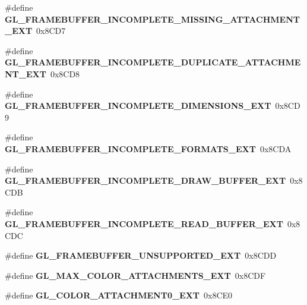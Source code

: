 \begin{DoxyCompactItemize}
\item 
\#define {\bfseries G\+L\+\_\+\+F\+R\+A\+M\+E\+B\+U\+F\+F\+E\+R\+\_\+\+I\+N\+C\+O\+M\+P\+L\+E\+T\+E\+\_\+\+M\+I\+S\+S\+I\+N\+G\+\_\+\+A\+T\+T\+A\+C\+H\+M\+E\+N\+T\+\_\+\+E\+X\+T}~0x8\+C\+D7\label{_s_d_l__opengl_8h_a9da899ca15cb6f3b95a56e015498eb65}

\item 
\#define {\bfseries G\+L\+\_\+\+F\+R\+A\+M\+E\+B\+U\+F\+F\+E\+R\+\_\+\+I\+N\+C\+O\+M\+P\+L\+E\+T\+E\+\_\+\+D\+U\+P\+L\+I\+C\+A\+T\+E\+\_\+\+A\+T\+T\+A\+C\+H\+M\+E\+N\+T\+\_\+\+E\+X\+T}~0x8\+C\+D8\label{_s_d_l__opengl_8h_a4495f7dce20c9643acaf77044a827530}

\item 
\#define {\bfseries G\+L\+\_\+\+F\+R\+A\+M\+E\+B\+U\+F\+F\+E\+R\+\_\+\+I\+N\+C\+O\+M\+P\+L\+E\+T\+E\+\_\+\+D\+I\+M\+E\+N\+S\+I\+O\+N\+S\+\_\+\+E\+X\+T}~0x8\+C\+D9\label{_s_d_l__opengl_8h_a40dd75292fef8732b397a1bf4241631c}

\item 
\#define {\bfseries G\+L\+\_\+\+F\+R\+A\+M\+E\+B\+U\+F\+F\+E\+R\+\_\+\+I\+N\+C\+O\+M\+P\+L\+E\+T\+E\+\_\+\+F\+O\+R\+M\+A\+T\+S\+\_\+\+E\+X\+T}~0x8\+C\+D\+A\label{_s_d_l__opengl_8h_aef8caac76934dfb6688f086595be9d18}

\item 
\#define {\bfseries G\+L\+\_\+\+F\+R\+A\+M\+E\+B\+U\+F\+F\+E\+R\+\_\+\+I\+N\+C\+O\+M\+P\+L\+E\+T\+E\+\_\+\+D\+R\+A\+W\+\_\+\+B\+U\+F\+F\+E\+R\+\_\+\+E\+X\+T}~0x8\+C\+D\+B\label{_s_d_l__opengl_8h_a5b20e3d2e251ddc8a57536e5c90436ff}

\item 
\#define {\bfseries G\+L\+\_\+\+F\+R\+A\+M\+E\+B\+U\+F\+F\+E\+R\+\_\+\+I\+N\+C\+O\+M\+P\+L\+E\+T\+E\+\_\+\+R\+E\+A\+D\+\_\+\+B\+U\+F\+F\+E\+R\+\_\+\+E\+X\+T}~0x8\+C\+D\+C\label{_s_d_l__opengl_8h_a4eeea1011dd39c7962ccc429aed24d26}

\item 
\#define {\bfseries G\+L\+\_\+\+F\+R\+A\+M\+E\+B\+U\+F\+F\+E\+R\+\_\+\+U\+N\+S\+U\+P\+P\+O\+R\+T\+E\+D\+\_\+\+E\+X\+T}~0x8\+C\+D\+D\label{_s_d_l__opengl_8h_a2b67225cbc7d7c72deb5e8e5c19c81f0}

\item 
\#define {\bfseries G\+L\+\_\+\+M\+A\+X\+\_\+\+C\+O\+L\+O\+R\+\_\+\+A\+T\+T\+A\+C\+H\+M\+E\+N\+T\+S\+\_\+\+E\+X\+T}~0x8\+C\+D\+F\label{_s_d_l__opengl_8h_aa4c6dc169b490cfa81f19423ca65a1f5}

\item 
\#define {\bfseries G\+L\+\_\+\+C\+O\+L\+O\+R\+\_\+\+A\+T\+T\+A\+C\+H\+M\+E\+N\+T0\+\_\+\+E\+X\+T}~0x8\+C\+E0\label{_s_d_l__opengl_8h_a4ff278d72e0f56e9a713ef0dc40b744c}


\end{DoxyCompactItemize}
